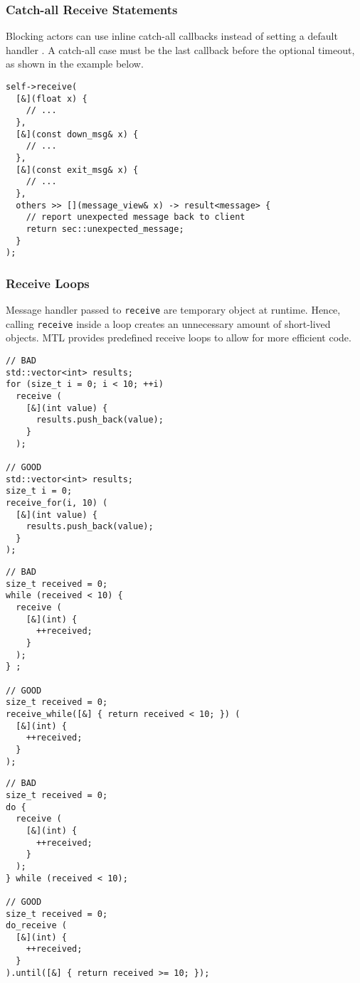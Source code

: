 \subsubsection{Catch-all Receive Statements}
\label{catch-all}

Blocking actors can use inline catch-all callbacks instead of setting a default
handler . A catch-all case must be the last callback
before the optional timeout, as shown in the example below.

\begin{lstlisting}
self->receive(
  [&](float x) {
    // ...
  },
  [&](const down_msg& x) {
    // ...
  },
  [&](const exit_msg& x) {
    // ...
  },
  others >> [](message_view& x) -> result<message> {
    // report unexpected message back to client
    return sec::unexpected_message;
  }
);
\end{lstlisting}

\clearpage
\subsubsection{Receive Loops}
\label{receive-loop}

Message handler passed to \lstinline^receive^ are temporary object at runtime.
Hence, calling \lstinline^receive^ inside a loop creates an unnecessary amount
of short-lived objects. MTL provides predefined receive loops to allow for
more efficient code.

\begin{lstlisting}
// BAD
std::vector<int> results;
for (size_t i = 0; i < 10; ++i)
  receive (
    [&](int value) {
      results.push_back(value);
    }
  );

// GOOD
std::vector<int> results;
size_t i = 0;
receive_for(i, 10) (
  [&](int value) {
    results.push_back(value);
  }
);
\end{lstlisting}

\begin{lstlisting}
// BAD
size_t received = 0;
while (received < 10) {
  receive (
    [&](int) {
      ++received;
    }
  );
} ;

// GOOD
size_t received = 0;
receive_while([&] { return received < 10; }) (
  [&](int) {
    ++received;
  }
);
\end{lstlisting}
\clearpage

\begin{lstlisting}
// BAD
size_t received = 0;
do {
  receive (
    [&](int) {
      ++received;
    }
  );
} while (received < 10);

// GOOD
size_t received = 0;
do_receive (
  [&](int) {
    ++received;
  }
).until([&] { return received >= 10; });
\end{lstlisting}

